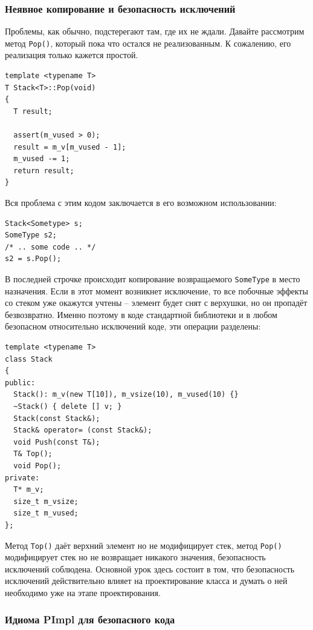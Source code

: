 \documentclass[a4paper,12pt,oneside]{article}
\begin{document}
\subsubsection{Неявное копирование и безопасность исключений}\label{ImplicitCopy}

Проблемы, как обычно, подстерегают там, где их не ждали. Давайте рассмотрим метод \lstinline!Pop()!, который пока что остался не реализованным. К сожалению, его реализация только кажется простой.

\begin{lstlisting}
template <typename T>
T Stack<T>::Pop(void)
{
  T result;

  assert(m_vused > 0);
  result = m_v[m_vused - 1];
  m_vused -= 1;
  return result;
}
\end{lstlisting}

Вся проблема с этим кодом заключается в его возможном использовании:

\begin{lstlisting}
Stack<Sometype> s;
SomeType s2;
/* .. some code .. */
s2 = s.Pop();
\end{lstlisting}

В последней строчке происходит копирование возвращаемого \lstinline!SomeType! в место назначения. Если в этот момент возникнет исключение, то все побочные эффекты со стеком уже окажутся учтены -- элемент будет снят с верхушки, но он пропадёт безвозвратно. Именно поэтому в коде стандартной библиотеки и в любом безопасном относительно исключений коде, эти операции разделены:

\begin{lstlisting}
template <typename T> 
class Stack
{
public:
  Stack(): m_v(new T[10]), m_vsize(10), m_vused(10) {}
  ~Stack() { delete [] v; }
  Stack(const Stack&);
  Stack& operator= (const Stack&);
  void Push(const T&);
  T& Top();
  void Pop();
private:
  T* m_v;
  size_t m_vsize;
  size_t m_vused;
};
\end{lstlisting}

Метод \lstinline!Top()! даёт верхний элемент но не модифицирует стек, метод \lstinline!Pop()! модифицирует стек но не возвращает никакого значения, безопасность исключений соблюдена. Основной урок здесь состоит в том, что безопасность исключений действительно влияет на проектирование класса и думать о ней необходимо уже на этапе проектирования.

\subsubsection{Идиома PImpl для безопасного кода}\label{PImpl}
\end{document}
